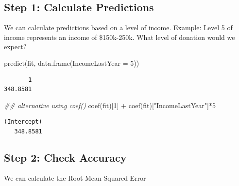 \documentclass[
  letterpaper,
  DIV=11,
  numbers=noendperiod]{scrreprt}
\newenvironment{Shaded}{\begin{snugshade}}{\end{snugshade}}
\newcommand{\AttributeTok}[1]{\textcolor[rgb]{0.40,0.45,0.13}{#1}}
\newcommand{\DecValTok}[1]{\textcolor[rgb]{0.68,0.00,0.00}{#1}}
\newcommand{\DocumentationTok}[1]{\textcolor[rgb]{0.37,0.37,0.37}{\textit{#1}}}
\newcommand{\FunctionTok}[1]{\textcolor[rgb]{0.28,0.35,0.67}{#1}}
\newcommand{\NormalTok}[1]{\textcolor[rgb]{0.00,0.23,0.31}{#1}}
\newcommand{\SpecialCharTok}[1]{\textcolor[rgb]{0.37,0.37,0.37}{#1}}
\newcommand{\StringTok}[1]{\textcolor[rgb]{0.13,0.47,0.30}{#1}}
\begin{document}
\hypertarget{step-1-calculate-predictions}{%
\subsection{Step 1: Calculate
Predictions}\label{step-1-calculate-predictions}}

We can calculate predictions based on a level of income. Example: Level
5 of income represents an income of \$150k-250k. What level of donation
would we expect?

\begin{Shaded}
\begin{Highlighting}[]
\FunctionTok{predict}\NormalTok{(fit, }\FunctionTok{data.frame}\NormalTok{(}\AttributeTok{IncomeLastYear =} \DecValTok{5}\NormalTok{))}
\end{Highlighting}
\end{Shaded}

\begin{verbatim}
       1 
348.8581 
\end{verbatim}

\begin{Shaded}
\begin{Highlighting}[]
\DocumentationTok{\#\# alternative using coef()}
\FunctionTok{coef}\NormalTok{(fit)[}\DecValTok{1}\NormalTok{] }\SpecialCharTok{+} \FunctionTok{coef}\NormalTok{(fit)[}\StringTok{"IncomeLastYear"}\NormalTok{]}\SpecialCharTok{*}\DecValTok{5}
\end{Highlighting}
\end{Shaded}

\begin{verbatim}
(Intercept) 
   348.8581 
\end{verbatim}

\hypertarget{step-2-check-accuracy}{%
\subsection{Step 2: Check Accuracy}\label{step-2-check-accuracy}}

We can calculate the Root Mean Squared Error

\begin{Shaded}
\end{Shaded}
\end{document}
